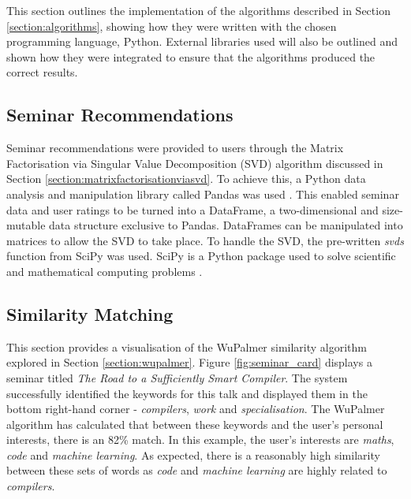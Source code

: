 \documentclass{l4proj}
\begin{document}
This section outlines the implementation of the algorithms described in Section \ref{section:algorithms}, showing how they were written with the chosen programming language, Python. External libraries used will also be outlined and shown how they were integrated to ensure that the algorithms produced the correct results. 

\subsection{Seminar Recommendations}

Seminar recommendations were provided to users through the Matrix Factorisation via Singular Value Decomposition (SVD) algorithm discussed in Section \ref{section:matrixfactorisationviasvd}. To achieve this, a Python data analysis and manipulation library called Pandas was used \citep{pandas}. This enabled seminar data and user ratings to be turned into a DataFrame, a two-dimensional and size-mutable data structure exclusive to Pandas. DataFrames can be manipulated into matrices to allow the SVD to take place. To handle the SVD, the pre-written \emph{svds} function from SciPy was used. SciPy is a Python package used to solve scientific and mathematical computing problems \citep{scipy}.

\subsection{Similarity Matching}

This section provides a visualisation of the WuPalmer similarity algorithm explored in Section \ref{section:wupalmer}. Figure \ref{fig:seminar_card} displays a seminar titled \emph{The Road to a Sufficiently Smart Compiler}. The system successfully identified the keywords for this talk and displayed them in the bottom right-hand corner - \emph{compilers}, \emph{work} and \emph{specialisation}. The WuPalmer algorithm has calculated that between these keywords and the user's personal interests, there is an 82\% match. In this example, the user's interests are \emph{maths}, \emph{code} and \emph{machine learning}. As expected, there is a reasonably high similarity between these sets of words as \emph{code} and \emph{machine learning} are highly related to \emph{compilers}.
\end{document}
